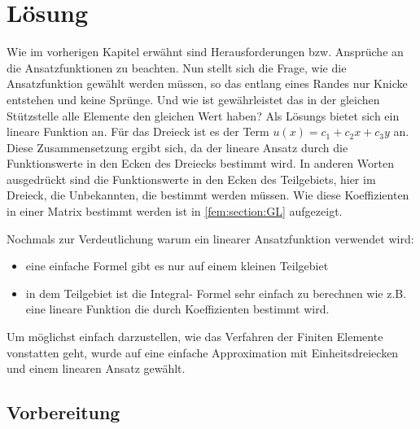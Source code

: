 %
%
%
\section{Lösung
\label{fem:section:loesung}}
Wie im vorherigen Kapitel erwähnt sind Herausforderungen bzw. Ansprüche an die Ansatzfunktionen zu beachten. Nun stellt sich die Frage, wie die Ansatzfunktion gewählt werden müssen, so das entlang eines Randes nur \frqq Knicke \flqq entstehen und keine Sprünge. Und wie ist gewährleistet das in der gleichen Stützstelle alle Elemente den gleichen Wert haben?  Als Lösungs bietet sich ein lineare Funktion an. Für das Dreieck  ist es der Term $u(x) = c_1 + c_2x + c_3y$ an. Diese Zusammensetzung ergibt sich, da der lineare Ansatz durch die Funktionswerte in den Ecken des Dreiecks bestimmt wird. In anderen Worten ausgedrückt sind die Funktionswerte in den Ecken des Teilgebiets, hier im Dreieck, die Unbekannten, die bestimmt werden müssen. Wie diese Koeffizienten in einer Matrix bestimmt werden ist in \ref{fem:section:GL} aufgezeigt.

Nochmals zur Verdeutlichung warum ein linearer Ansatzfunktion verwendet wird:
\begin{itemize}
	\item eine einfache Formel gibt es nur auf einem kleinen Teilgebiet
	\item in dem Teilgebiet ist die Integral- Formel sehr einfach zu berechnen wie z.B. eine lineare Funktion die durch Koeffizienten bestimmt wird.
\end{itemize}
Um möglichst einfach darzustellen, wie das Verfahren der Finiten Elemente vonstatten geht, wurde auf eine einfache Approximation mit Einheitsdreiecken und einem linearen Ansatz gewählt. 

\subsection{Vorbereitung
\label{fem:section:loesungTrans}}

